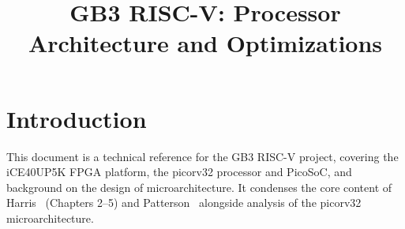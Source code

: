 \documentclass[9pt, a4paper]{extarticle}
\title{GB3 RISC-V: Processor Architecture and Optimizations}
\date{}
\begin{document}
\maketitle

\section{Introduction}

This document is a technical reference for the GB3 RISC-V project, covering the iCE40UP5K FPGA platform, the picorv32 processor and PicoSoC, and background on the design of microarchitecture. It condenses the core content of Harris~\cite{harris2022} (Chapters 2--5) and Patterson~\cite{patterson2017} alongside analysis of the picorv32 microarchitecture.

\end{document}
